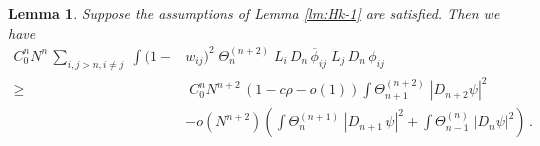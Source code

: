 \documentclass[11pt]{article}
\newtheorem{lemma}[theorem]{Lemma}
\begin{document}
\begin{lemma}\label{lm:Hk-1-1}
Suppose the assumptions of Lemma \ref{lm:Hk-1} are satisfied. Then
we have
\begin{equation}
\begin{split}
C_0^n N^n \, \sum_{i,j > n, i\neq j} \; \int (1-&w_{ij})^2 \;
\Theta^{(n+2)}_n \; L_i \, D_n \,\overline{\phi}_{ij} \; L_j \, D_n
\, \phi_{ij}
\\ \geq & \; C_0^n N^{n+2} \, (1- c\rho -o(1)) \int
\Theta^{(n+2)}_{n+1} \; |D_{n+2} \psi|^2 \\ &-o(N^{n+2}) \left( \int
\Theta^{(n+1)}_{n} \; |D_{n+1} \, \psi|^2 + \int \Theta_{n-1}^{(n)}
\; |D_n \psi|^2 \right)\,.
\end{split}
\end{equation}
\end{lemma}
\end{document}
